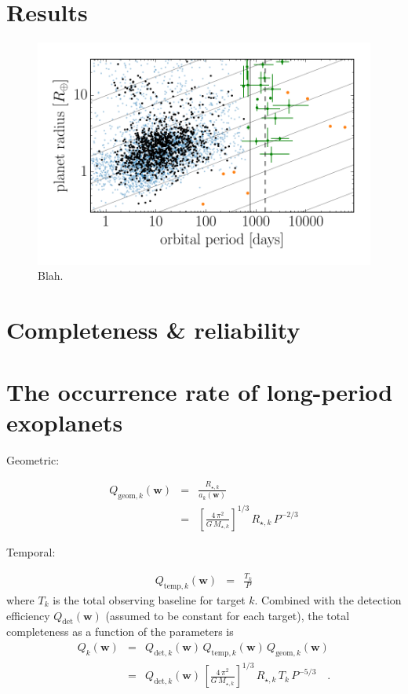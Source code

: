 \documentclass[12pt,preprint]{aastex}
\newcommand{\figlabel}[1]{\label{fig:#1}}
\newcommand{\bvec}[1]{{\ensuremath{\boldsymbol{#1}}}}
\newcommand{\params}{{\ensuremath{\bvec{w}}}}
\begin{document}
\section{Results}

\begin{figure}[p]
\begin{center}
\includegraphics{figures/full_sample.pdf}
\end{center}
\caption{%
Blah.
\figlabel{full-sample}}
\end{figure}


\section{Completeness \& reliability}


\section{The occurrence rate of long-period exoplanets}

Geometric:

\begin{eqnarray}
Q_{\mathrm{geom},k} (\params) &=& \frac{R_{\star,k}}{a_k(\params)} \\
&=& \left[\frac{4\,\pi^2}{G\,M_{\star,k}}\right]^{1/3}\,R_{\star,k}\,P^{-2/3}
\end{eqnarray}

Temporal:

\begin{eqnarray}
Q_{\mathrm{temp},k} (\params) &=& \frac{T_k}{P}
\end{eqnarray}
where $T_k$ is the total observing baseline for target $k$.
Combined with the detection efficiency $Q_{\mathrm{det}}(\params)$ (assumed to
be constant for each target), the total completeness as a function of the
parameters is
\begin{eqnarray}
Q_k(\params) &=& Q_{\mathrm{det},k}(\params) \,
                 Q_{\mathrm{temp},k} (\params) \,
                 Q_{\mathrm{geom},k} (\params) \\
&=& Q_{\mathrm{det},k}(\params) \,
    \left[\frac{4\,\pi^2}{G\,M_{\star,k}}\right]^{1/3}\,
    R_{\star,k}\,T_k\,P^{-5/3} \quad.
\end{eqnarray}
\end{document}
